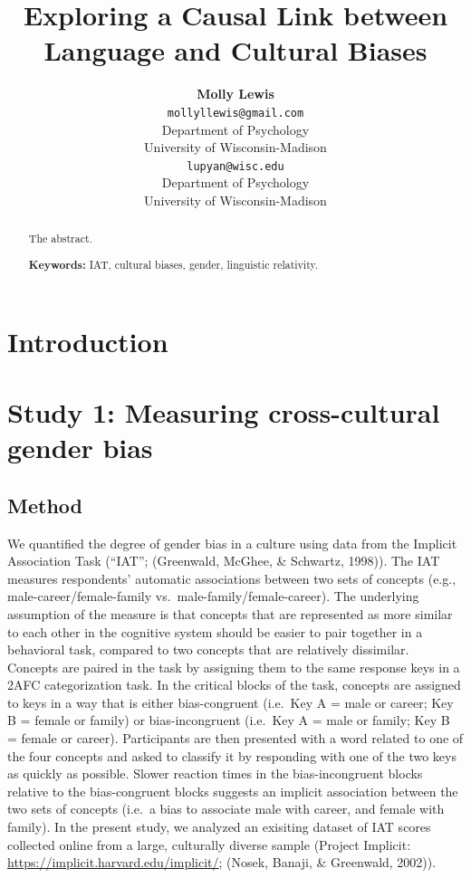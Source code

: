 \documentclass[10pt, letterpaper]{article}
\title{Exploring a Causal Link between Language and Cultural Biases}
\author{{\large \bf Molly Lewis} \\ \texttt{mollyllewis@gmail.com} \\ Department of Psychology  \\ University of Wisconsin-Madison \And {\large \bf Gary Lupyan} \\ \texttt{lupyan@wisc.edu} \\ Department of Psychology  \\ University of Wisconsin-Madison}
\begin{document}
\maketitle

\begin{abstract}
The abstract.

\textbf{Keywords:}
IAT, cultural biases, gender, linguistic relativity.
\end{abstract}

\section{Introduction}\label{introduction}

\section{Study 1: Measuring cross-cultural gender
bias}\label{study-1-measuring-cross-cultural-gender-bias}

\subsection{Method}\label{method}

We quantified the degree of gender bias in a culture using data from the
Implicit Association Task (``IAT''; (Greenwald, McGhee, \& Schwartz,
1998)). The IAT measures respondents' automatic associations between two
sets of concepts (e.g., male-career/female-family
vs.~male-family/female-career). The underlying assumption of the measure
is that concepts that are represented as more similar to each other in
the cognitive system should be easier to pair together in a behavioral
task, compared to two concepts that are relatively dissimilar. Concepts
are paired in the task by assigning them to the same response keys in a
2AFC categorization task. In the critical blocks of the task, concepts
are assigned to keys in a way that is either bias-congruent (i.e.~Key A
= male or career; Key B = female or family) or bias-incongruent
(i.e.~Key A = male or family; Key B = female or career). Participants
are then presented with a word related to one of the four concepts and
asked to classify it by responding with one of the two keys as quickly
as possible. Slower reaction times in the bias-incongruent blocks
relative to the bias-congruent blocks suggests an implicit association
between the two sets of concepts (i.e.~a bias to associate male with
career, and female with family). In the present study, we analyzed an
exisiting dataset of IAT scores collected online from a large,
culturally diverse sample (Project Implicit:
\url{https://implicit.harvard.edu/implicit/}; (Nosek, Banaji, \&
Greenwald, 2002)).
\end{document}
